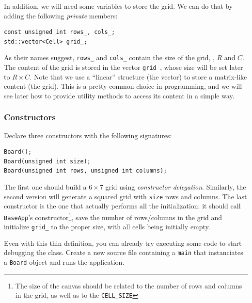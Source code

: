 \documentclass{article}
\begin{document}
In addition, we will need some variables to store the grid. We can do that by adding the following \emph{private} members:
\begin{center}
\begin{minipage}{.9\textwidth}
\begin{lstlisting}[style=mycpp,numbers=none]
const unsigned int rows_, cols_;
std::vector<Cell> grid_;
\end{lstlisting}
\end{minipage}
\end{center}
As their names suggest, \texttt{rows\_} and \texttt{cols\_} contain the size of the grid, \ie, $R$ and $C$. The content of the grid is stored in the vector \texttt{grid\_}, whose size will be set later to $R\times C$. Note that we use a ``linear'' structure (the vector) to store a matrix-like content (the grid). This is a pretty common choice in programming, and we will see later how to provide utility methods to access its content in a simple way.

\subsubsection{Constructors}

Declare three constructors with the following signatures:
\begin{center}
\begin{minipage}{.9\textwidth}
\begin{lstlisting}[style=mycpp,numbers=none]
Board();
Board(unsigned int size);
Board(unsigned int rows, unsigned int columns);
\end{lstlisting}
\end{minipage}
\end{center}
The first one should build a $6\times 7$ grid using \emph{constructor delegation}. Similarly, the second version will generate a squared grid with \texttt{size} rows and columns. The last constructor is the one that actually performs all the initialization: it should call \texttt{BaseApp}'s constructor\footnote{The size of the canvas should be related to the number of rows and columns in the grid, as well as to the \texttt{CELL\_SIZE}}, save the number of rows/columns in the grid and initialize \texttt{grid\_} to the proper size, with all cells being initially empty.

Even with this thin definition, you can already try executing some code to start debugging the class. Create a new source file containing a \texttt{main} that instanciates a \texttt{Board} object and runs the application.
\end{document}
